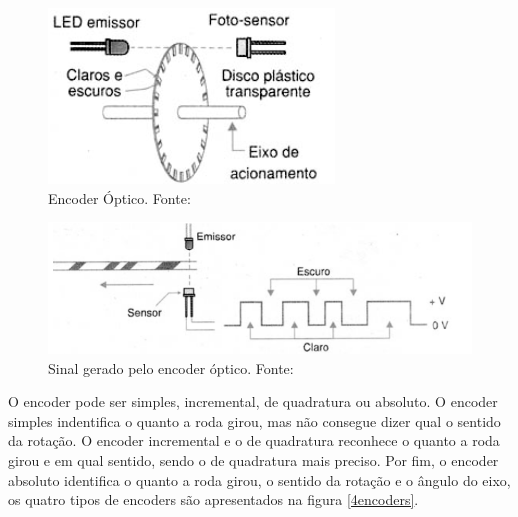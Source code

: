 \begin{enumerate}
          \begin{figure}[h]
            \centering
            \includegraphics[scale=1]{figuras/encoderoptico.png}
            \caption{Encoder Óptico. Fonte:\cite{NewtonB_enc}}
            \label{encoder}
          \end{figure}
          
          \begin{figure}[h]
            \centering
            \includegraphics[scale=1]{figuras/sinalencoder.png}
            \caption{Sinal gerado pelo encoder óptico. Fonte:\cite{NewtonB_enc}}
            \label{sinal_enc}
          \end{figure}

          O encoder pode ser simples, incremental, de quadratura ou absoluto. O encoder simples indentifica o quanto a roda girou, mas não consegue dizer qual o sentido da rotação. O encoder incremental e o de quadratura reconhece o quanto a roda girou e em qual sentido, sendo o de quadratura mais preciso. Por fim, o encoder absoluto identifica o quanto a roda girou, o sentido da rotação e o ângulo do eixo, os quatro tipos de encoders são apresentados na figura \ref{4encoders}.


\end{enumerate}
